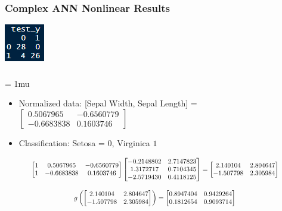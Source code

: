 \documentclass{beamer}
\newcommand\scalemath[2]{\scalebox{#1}{\mbox{\ensuremath{\displaystyle #2}}}}
\begin{document}
\begin{frame}
    \frametitle{Complex ANN Nonlinear Results}

    \centerline{\includegraphics[scale = 2]{complexnnnonlinear.png}}

\end{frame}

\begin{frame}
    \frametitle{}
    \footnotesize
    \setlength{\arraycolsep}{2.5pt}
    \medmuskip = 1mu %
    \begin{itemize}
        \item Normalized data: [Sepal Width, Sepal Length] = 
        $\begin{bmatrix}
            0.5067965 & -0.6560779\\
            -0.6683838 & 0.1603746
        \end{bmatrix}$
        \item Classification: Setosa = $0$, Virginica $1$
    \end{itemize}

    \[
    \scalemath{0.8}{
    \begin{bmatrix}
        1 & 0.5067965 & -0.6560779\\
        1 & -0.6683838 & 0.1603746
    \end{bmatrix}
    \begin{bmatrix}
        -0.2148802 & 2.7147823\\
        1.3172717 & 0.7104345\\
        -2.5719430 & 0.4118125
    \end{bmatrix}= 
    \begin{bmatrix}
        2.140104 & 2.804647\\
        -1.507798 & 2.305984
    \end{bmatrix}
    }
    \]

    \[
    \scalemath{0.8}{
    g \left( \begin{bmatrix}
        2.140104 & 2.804647\\
        -1.507798 & 2.305984
    \end{bmatrix} \right) =
    \begin{bmatrix}
        0.8947404 & 0.9429264\\
        0.1812654 & 0.9093714
    \end{bmatrix}
    }
    \]


\end{frame}
\end{document}
